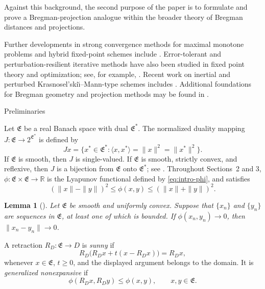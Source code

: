 \documentclass[leqno,12pt]{amsart}
\makeatletter
\newtheorem{lemma}[theorem]{Lemma}
\theoremstyle{definition}
\theoremstyle{remark}
\numberwithin{equation}{section}
\newcommand{\E}{\mathfrak{E}}
\def\section{\@startsection{section}{1}%
  \z@{.7\linespacing\@plus\linespacing}{.5\linespacing}%
  {\normalfont\bfseries\centering}}
\makeatother
\begin{document}
Against this background, the second purpose of the paper is to formulate and
prove a Bregman-projection analogue within the broader theory of Bregman
distances and projections.

\medskip
{}
Further developments in strong convergence methods for maximal monotone
problems and hybrid fixed-point schemes include
\cite{BelloAMUC2022,ChidumeOtuboEzeaUba2017,ChidumeUbaUzochukwuOtuboIdu2019,
IbarakiTakahashi2010,KlineamSuantaiTakahashi2012,
UbaOtuboOnyido2021,UbaCarpathian2023}.
Error-tolerant and perturbation-resilient iterative methods have also been
studied in fixed point theory and optimization; see, for example,
\cite{Combettes2001,IbarakiSaejung2023,ReichSabach2010}.
Recent work on inertial and perturbed Krasnosel'ski\u\i--Mann-type schemes includes
\cite{CortildPeypouquet2025}. Additional foundations for Bregman geometry and
projection methods may be found in \cite{ButnariuResmerita2006}.

\section{Preliminaries}

Let $\E$ be a real Banach space with dual $\E^*$. The normalized duality mapping $J:\E\to2^{\E^*}$ is defined by
\[
 Jx=\bigl\{x^*\in\E^*: \langle x,x^*\rangle=\|x\|^2=\|x^*\|^2\bigr\}.
\]
If $\E$ is smooth, then $J$ is single-valued. If $\E$ is smooth, strictly convex, and reflexive, then $J$ is a bijection from $\E$ onto $\E^*$; see \cite{Alber1996}. Throughout Sections~2 and 3, $\phi:\E\times\E\to \mathbb{R}$ is the Lyapunov functional defined by \eqref{eq:intro-phi}, and satisfies
\begin{equation}\label{eq:phi-lower}
 (\|x\|-\|y\|)^2\leq \phi(x,y)\leq(\|x\|+\|y\|)^2.
\end{equation}

\begin{lemma}[\cite{KamimuraTakahashi2003}]\label{lem:phi-consistency}
Let $\E$ be smooth and uniformly convex. Suppose that $\{x_n\}$ and $\{y_n\}$ are sequences in $\E$, at least one of which is bounded. If $\phi(x_n,y_n)\to0$, then $\|x_n-y_n\|\to0$.
\end{lemma}

A retraction $R_D:\E\to D$ is \emph{sunny} if
\[
 R_D\bigl(R_Dx+t(x-R_Dx)\bigr)=R_Dx,
\]
whenever $x\in\E$, $t\geq0$, and the displayed argument belongs to the domain. It is \emph{generalized nonexpansive} if
\[
 \phi(R_Dx,R_Dy)\leq \phi(x,y),
 \qquad x,y\in\E.
\]
\end{document}
